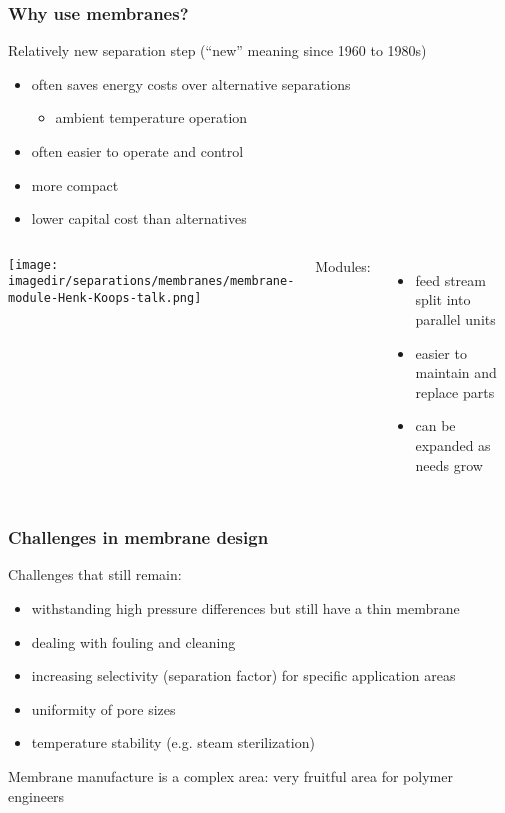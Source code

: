\begin{frame}\frametitle{Why use membranes?}
	Relatively new separation step {\small (``new'' meaning since 1960 to 1980s)}
	\begin{itemize}
		\item	often saves energy costs over alternative separations
		\begin{itemize}
			\item	ambient temperature operation
		\end{itemize}
		\item	often easier to operate and control
		\item	more compact  %
		\item	lower capital cost than alternatives %
	\end{itemize}

	\begin{columns}[c]
			\begin{center}
				\texttt{[image: \\imagedir/separations/membranes/membrane-module-Henk-Koops-talk.png]}
			\end{center}
			Modules:
			\begin{itemize}
				\item	feed stream split into parallel units
				\item	easier to maintain and replace parts
				\item	can be expanded as needs grow
			\end{itemize}
	\end{columns}
\end{frame}

\begin{frame}\frametitle{Challenges in membrane design}
	Challenges that still remain:
	\begin{itemize}
		\item	withstanding high pressure differences but still have a thin membrane
		\item	dealing with fouling and cleaning
		\item	increasing selectivity (separation factor) for specific application areas
		\item	uniformity of pore sizes
		\item	temperature stability (e.g. steam sterilization)
	\end{itemize}
	
	\vspace{12pt}
	{\color{myOrange}Membrane manufacture is a complex area: very fruitful area for polymer engineers}
\end{frame}

